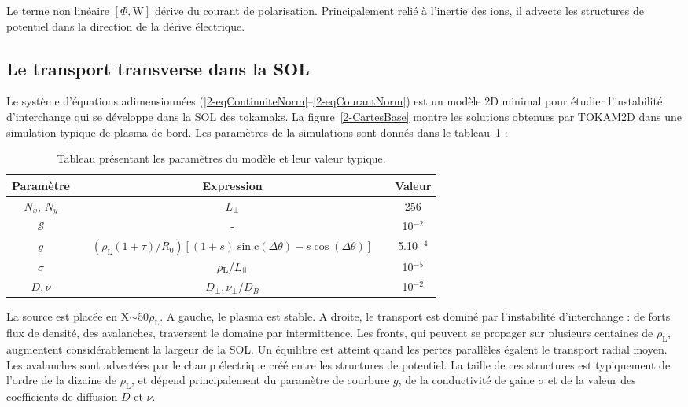 \begin{refsection}
 Le terme non linéaire $[\Phi,\text{W}]$ dérive du courant de polarisation.
 Principalement relié à l'inertie des ions, il advecte les structures de
 potentiel dans la direction de la dérive électrique.
 

\subsection{Le transport transverse dans la SOL}

Le système d'équations
adimensionnées (\eqref{2-eqContinuiteNorm}--\eqref{2-eqCourantNorm}) est un
modèle 2D minimal pour étudier l'instabilité d'interchange qui se développe dans
la SOL des tokamaks. La figure~\ref{2-CartesBase} montre les solutions obtenues
par TOKAM2D dans une simulation typique de plasma de bord. Les paramètres de la
simulations sont donnés dans le tableau~\ref{2-TokamParam} :
\begin{table}[!htbp]
\footnotesize\centering
{}
\begin{tabular}{@{}ccccc@{}}\toprule
Paramètre&&Expression&&Valeur\\
\midrule 
$N_x$, $N_y$ && $L_\perp$ && 256\\
$\mathcal{S}$ && - && 10$^{-2}$\\
$g$ &&
$(\rho_\text{L}(1+\tau)/R_0)[(1+s)\sin\text{c}(\Delta\theta)
-s\cos(\Delta\theta)]$ && 5.10$^{-4}$\\
$\sigma$ &&
$\rho_\text{L}/L_\para$ &&
10$^{-5}$\\
$D,\nu$ &&
$D_\perp,\nu_\perp/D_B$ &&
10$^{-2}$\\
\bottomrule
\end{tabular}
\caption{Tableau présentant les paramètres du modèle et
leur valeur typique.}\label{2-TokamParam}
\end{table}

La source est placée en X$\sim$50$\rho_\text{L}$. A gauche, le plasma est
stable. A droite, le transport est dominé par l'instabilité d'interchange : de
forts flux de densité, des avalanches, traversent le domaine par intermittence.
Les fronts, qui peuvent se propager sur plusieurs centaines de
$\rho_\text{L}$, augmentent considérablement la largeur de la SOL.
Un équilibre est atteint quand les pertes parallèles égalent le transport
radial moyen.
Les avalanches sont advectées par le champ électrique créé entre les structures
de potentiel. La taille de ces structures est typiquement de l'ordre de la
dizaine de $\rho_\text{L}$, et dépend principalement 
du paramètre de courbure $g$, de la conductivité de gaine $\sigma$ et de la
valeur des coefficients de diffusion $D$ et $\nu$.


\end{refsection}
